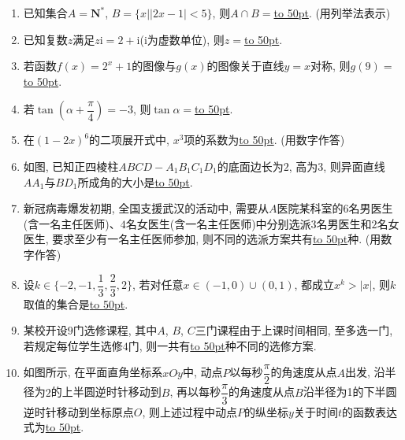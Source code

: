 \documentclass[10pt,a4paper]{article}
\newcommand{\blank}[1]{\underline{\hbox to #1pt{}}}
\begin{document}
\begin{enumerate}[1.]
\item 已知集合$A=\mathbf{N}^*$, $B=\{x||2x-1|<5\}$, 则$A\cap B=$\blank{50}. (用列举法表示)
\item 已知复数$z$满足$z\mathrm{i}=2+\mathrm{i}$($\mathrm{i}$为虚数单位), 则$z=$\blank{50}.
\item 若函数$f(x)=2^x+1$的图像与$g(x)$的图像关于直线$y=x$对称, 则$g(9)=$\blank{50}.
\item 若$\tan (\alpha +\dfrac{\pi }4)=-3$, 则$\tan \alpha =$\blank{50}.
\item 在$(1-2x)^6$的二项展开式中, $x^3$项的系数为\blank{50}. (用数字作答)
\item 如图, 已知正四棱柱$ABCD-A_1B_1C_1D_1$的底面边长为$2$, 高为$3$, 则异面直线$AA_1$与$BD_1$所成角的大小是\blank{50}.
\begin{center}
\end{center}
\item 新冠病毒爆发初期, 全国支援武汉的活动中, 需要从$A$医院某科室的$6$名男医生(含一名主任医师)、$4$名女医生(含一名主任医师)中分别选派$3$名男医生和$2$名女医生, 要求至少有一名主任医师参加, 则不同的选派方案共有\blank{50}种. (用数字作答)
\item 设$k\in \{-2,-1,\dfrac 13,\dfrac 23,2\}$, 若对任意$x\in (-1,0)\cup (0,1)$, 都成立$x^k>|x|$, 则$k$取值的集合是\blank{50}.
\item 某校开设$9$门选修课程, 其中$A$, $B$, $C$三门课程由于上课时间相同, 至多选一门, 若规定每位学生选修$4$门, 则一共有\blank{50}种不同的选修方案.
\item 如图所示, 在平面直角坐标系$xOy$中, 动点$P$以每秒$\dfrac{\pi }2$的角速度从点$A$出发, 沿半径为$2$的上半圆逆时针移动到$B$, 再以每秒$\dfrac{\pi }3$的角速度从点$B$沿半径为1的下半圆逆时针移动到坐标原点$O$, 则上述过程中动点$P$的纵坐标$y$关于时间$t$的函数表达式为\blank{50}.
\begin{center}
\begin{tikzpicture}[>=latex]

\end{tikzpicture}
\end{center}
\end{enumerate}
\end{document}
